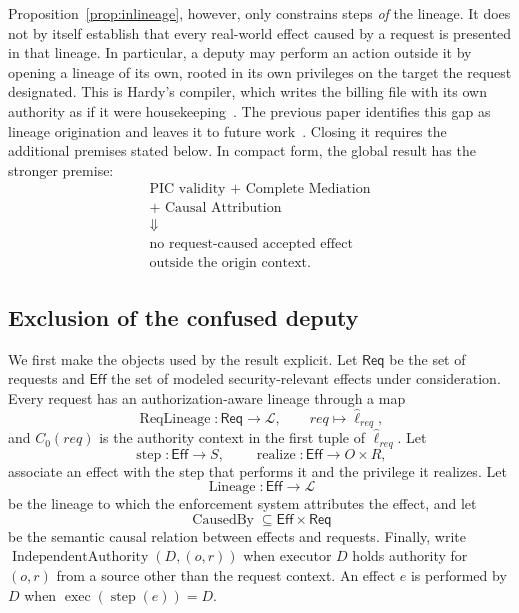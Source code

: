 \documentclass[10pt,twocolumn]{article}
\newcommand{\Lineages}{\mathcal{L}}
\newcommand{\exec}{\operatorname{exec}}
\begin{document}
Proposition~\ref{prop:inlineage}, however, only constrains steps \emph{of} the
lineage. It does not by itself establish that every real-world effect caused by
a request is presented in that lineage. In particular, a deputy may perform an
action outside it by opening a lineage of its own, rooted in its own privileges
on the target the request designated. This is Hardy's compiler, which writes
the billing file with its own authority as if it were
housekeeping~\cite{hardy1988confused}. The previous paper identifies this gap
as lineage origination and leaves it to future work~\cite{gallo2026poc}.
Closing it requires the additional premises stated below. In compact form, the
global result has the stronger premise:
\[
\boxed{
\begin{gathered}
\text{PIC validity + Complete Mediation}\\
\text{+ Causal Attribution}\\
\Downarrow\\
\text{no request-caused accepted effect}\\
\text{outside the origin context}.
\end{gathered}
}
\]

\subsection{Exclusion of the confused deputy}

We first make the objects used by the result explicit. Let \(\mathsf{Req}\) be
the set of requests and \(\mathsf{Eff}\) the set of modeled security-relevant
effects under consideration. Every
request has an authorization-aware lineage through a map
\[
\operatorname{ReqLineage}:\mathsf{Req}\rightarrow\Lineages,
\qquad
req\longmapsto\widehat{\ell}_{req},
\]
and \(C_0(req)\) is the authority context in the first tuple of
\(\widehat{\ell}_{req}\). Let
\[
\operatorname{step}:\mathsf{Eff}\rightarrow S,
\qquad
\operatorname{realize}:\mathsf{Eff}\rightarrow O\times R,
\]
associate an effect with the step that performs it and the privilege it
realizes. Let
\[
\operatorname{Lineage}:\mathsf{Eff}\rightarrow\Lineages
\]
be the lineage to which the enforcement system attributes the effect, and let
\[
\operatorname{CausedBy}\subseteq\mathsf{Eff}\times\mathsf{Req}
\]
be the semantic causal relation between effects and requests. Finally, write
\(\operatorname{IndependentAuthority}(D,(o,r))\) when executor \(D\) holds
authority for \((o,r)\) from a source other than the request context. An effect
\(e\) is performed by \(D\) when
\(\exec(\operatorname{step}(e))=D\).
\end{document}
